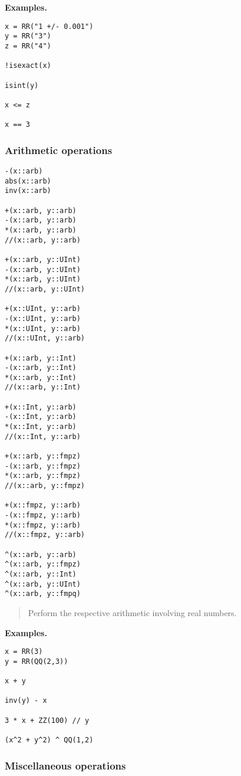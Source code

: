 \documentclass[a4paper,10pt]{article}
\newcommand{\desc}[1]{\vspace{-3mm}\begin{quote}#1\end{quote}}
\begin{document}
{{\textbf{Examples.}

\begin{lstlisting}
x = RR("1 +/- 0.001")
y = RR("3")
z = RR("4")

!isexact(x)

isint(y)

x <= z

x == 3

\end{lstlisting}

\subsubsection{Arithmetic operations}

\begin{lstlisting}
-(x::arb)
abs(x::arb)
inv(x::arb)

+(x::arb, y::arb)
-(x::arb, y::arb)
*(x::arb, y::arb)
//(x::arb, y::arb)

+(x::arb, y::UInt)
-(x::arb, y::UInt)
*(x::arb, y::UInt)
//(x::arb, y::UInt)

+(x::UInt, y::arb)
-(x::UInt, y::arb)
*(x::UInt, y::arb)
//(x::UInt, y::arb)

+(x::arb, y::Int)
-(x::arb, y::Int)
*(x::arb, y::Int)
//(x::arb, y::Int)

+(x::Int, y::arb)
-(x::Int, y::arb)
*(x::Int, y::arb)
//(x::Int, y::arb)

+(x::arb, y::fmpz)
-(x::arb, y::fmpz)
*(x::arb, y::fmpz)
//(x::arb, y::fmpz)

+(x::fmpz, y::arb)
-(x::fmpz, y::arb)
*(x::fmpz, y::arb)
//(x::fmpz, y::arb)

^(x::arb, y::arb)
^(x::arb, y::fmpz)
^(x::arb, y::Int)
^(x::arb, y::UInt)
^(x::arb, y::fmpq)
\end{lstlisting}

\desc{Perform the respective arithmetic involving real numbers.}

\textbf{Examples.}

\begin{lstlisting}
x = RR(3)
y = RR(QQ(2,3))

x + y

inv(y) - x

3 * x + ZZ(100) // y

(x^2 + y^2) ^ QQ(1,2)
\end{lstlisting}

\subsubsection{Miscellaneous operations}

}}
\end{document}
